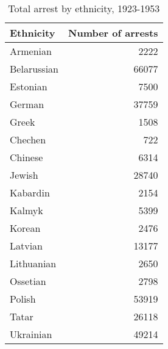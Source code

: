 \begin{table}

\caption{\label{tab:}Total arrest by ethnicity, 1923-1953}
\centering
\begin{tabular}[t]{lr}
\toprule
Ethnicity & Number of arrests\\
\midrule
Armenian & 2222\\
Belarussian & 66077\\
Estonian & 7500\\
German & 37759\\
Greek & 1508\\
\addlinespace
Chechen & 722\\
Chinese & 6314\\
Jewish & 28740\\
Kabardin & 2154\\
Kalmyk & 5399\\
\addlinespace
Korean & 2476\\
Latvian & 13177\\
Lithuanian & 2650\\
Ossetian & 2798\\
Polish & 53919\\
\addlinespace
Tatar & 26118\\
Ukrainian & 49214\\
\bottomrule
\end{tabular}
\end{table}